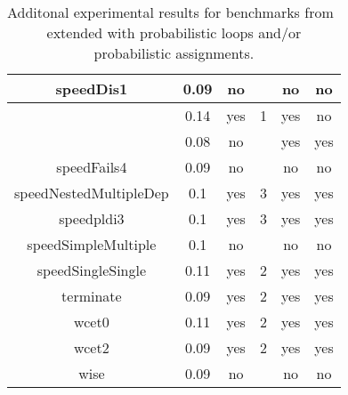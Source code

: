 \begin{center}
\begin{table}[]
\begin{tabular}{c|c|c|c|c|c}
{speedDis1} & {0.09} & {no} & {} & {no} & {no} \\\hline
{\multirow{2}{*}{speedFails2}} & {0.14} & {yes} & {1} & {yes} & {no} \\\cline{2-6}
{} & {0.08} & {no} & {} & {yes} & {yes} \\\hline
{speedFails4} & {0.09} & {no} & {} & {no} & {no} \\\hline
{speedNestedMultipleDep} & {0.1} & {yes} & {3} & {yes} & {yes} \\\hline
{speedpldi3} & {0.1} & {yes} & {3} & {yes} & {yes} \\\hline
{speedSimpleMultiple} & {0.1} & {no} & {} & {no} & {no} \\\hline
{speedSingleSingle} & {0.11} & {yes} & {2} & {yes} & {yes} \\\hline
{terminate} & {0.09} & {yes} & {2} & {yes} & {yes} \\\hline
{wcet0} & {0.11} & {yes} & {2} & {yes} & {yes} \\\hline
{wcet2} & {0.09} & {yes} & {2} & {yes} & {yes} \\\hline
{wise} & {0.09} & {no} & {} & {no} & {no} \\\hline
    \end{tabular}
    \caption{Additonal experimental results for benchmarks from~\cite{ADFG10:lexicographic} extended with probabilistic loops and/or probabilistic assignments.}
    \label{tab:exp3}
\end{table}
\end{center}


